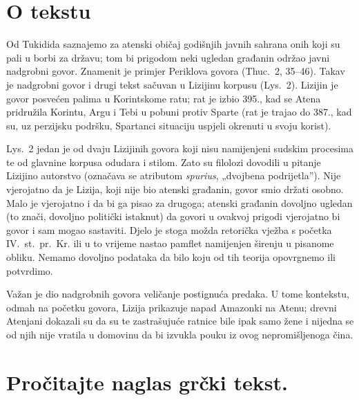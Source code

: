 

\section*{O tekstu}

Od Tukidida saznajemo za atenski običaj godišnjih javnih sahrana onih koji su pali u borbi za državu; tom bi prigodom neki ugledan građanin održao javni nadgrobni govor. Znamenit je primjer Periklova govora (Thuc.~2, 35–46). Takav je nadgrobni govor i drugi tekst sačuvan u Lizijinu korpusu (Lys.~2). Lizijin je govor posvećen palima u Korintskome ratu; rat je izbio 395., kad se Atena pridružila Korintu, Argu i Tebi u pobuni protiv Sparte (rat je trajao do 387., kad su, uz perzijsku podršku, Spartanci situaciju uspjeli okrenuti u svoju korist).

Lys.~2 jedan je od dvaju Lizijinih govora koji nisu namijenjeni sudskim procesima te od glavnine korpusa odudara i stilom. Zato su filolozi dovodili u pitanje Lizijino autorstvo (označava se atributom \textit{spurius}, „dvojbena podrijetla''). Nije vjerojatno da je Lizija, koji nije bio atenski građanin, govor smio držati osobno. Malo je vjerojatno i da bi ga pisao za drugoga; atenski građanin dovoljno ugledan (to znači, dovoljno politički istaknut) da govori u ovakvoj prigodi vjerojatno bi govor i sam mogao sastaviti. Djelo je stoga možda retorička vježba s početka IV.~st.\ pr.~Kr. ili u to vrijeme nastao pamflet namijenjen širenju u pisanome obliku. Nemamo dovoljno podataka da bilo koju od tih teorija opovrgnemo ili potvrdimo.

Važan je dio nadgrobnih govora veličanje postignuća predaka. U tome kontekstu, odmah na početku govora, Lizija prikazuje napad Amazonki na Atenu; drevni Atenjani dokazali su da su te zastrašujuće ratnice bile ipak samo žene i nijedna se od njih nije vratila u domovinu da bi izvukla pouku iz ovog nepromišljenoga čina.


\newpage

\section*{Pročitajte naglas grčki tekst.}

